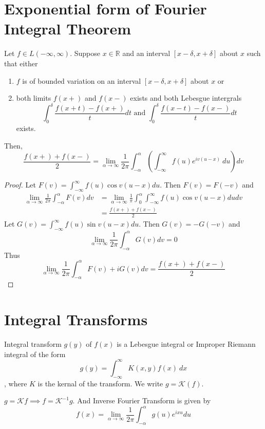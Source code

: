 \section{Exponential form of Fourier Integral Theorem}
	Let $f \in L(-\infty,\infty)$. Suppose $x \in \mathbb{R}$ and an interval $[x-\delta,x+\delta]$ about $x$ such that either 
	\begin{enumerate}
		\item $f$ is of bounded variation on an interval $[x-\delta,x+\delta]$ about $x$ or
		\item both limits $f(x+)$ and $f(x-)$ exists and both Lebesgue intergrals
			$$\int_0^\delta \frac{f(x+t)-f(x+)}{t} dt \text{ and }\int_0^\delta \frac{f(x-t)-f(x-)}{t} dt$$
			exists.
	\end{enumerate}
	Then, 
	$$\frac{f(x+)+f(x-)}{2} = \lim_{\alpha \to \infty} \frac{1}{2\pi} \int_{-\alpha}^\alpha \left( \int_{-\infty}^\infty f(u) e^{iv(u-x)}\ du\right) dv$$
	\begin{proof}
		Let $F(v) = \int_{-\infty}^\infty f(u) \cos v(u-x) du$. Then $F(v) = F(-v)$ and 
		\begin{align*}
			\lim_{\alpha \to \infty} \frac{1}{2\pi} \int_{-\alpha}^\alpha F(v) dv
			& = \lim_{\alpha \to \infty} \frac{1}{\pi} \int_0^\alpha \int_{-\infty}^\infty f(u) \cos v(u-x) du dv\\
			& = \frac{f(x+)+f(x-)}{2}
		\end{align*}
		Let $G(v) = \int_{-\infty}^\infty f(u) \sin v(u-x) du$. Then $G(v) = -G(-v)$ and
		$$\lim_{\alpha \to \infty} \frac{1}{2\pi} \int_{-\alpha}^\alpha G(v) dv = 0$$
		Thus 
		$$\lim_{\alpha \to \infty} \frac{1}{2\pi} \int_{-\alpha}^\alpha F(v) + iG(v) dv = \frac{f(x+)+f(x-)}{2}$$
	\end{proof}

\section{Integral Transforms}
\begin{definition}
	Integral transform $g(y)$ of $f(x)$ is a Lebesgue integral or Improper Riemann integral of the form
	$$g(y) = \int_{-\infty}^\infty K(x,y) f(x)\ dx$$, where $K$ is the kernal of the transform. We write $g = \mathcal{K}(f)$.
\end{definition}

\begin{remark}
	$g = \mathcal{K}f \implies f = \mathcal{K}^{-1} g$. And Inverse Fourier Transform is given by
	$$f(x) = \lim_{\alpha \to \infty} \frac{1}{2\pi}\int_{-\alpha}^\alpha g(u) e^{ixu} du$$
\end{remark}

